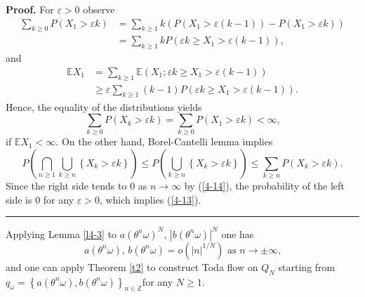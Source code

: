 \documentclass[a4paper]{article}%
\newenvironment{proof}[1][Proof]{\noindent\textbf{#1.} }{\ \rule{0.5em}{0.5em}}
\begin{document}
\begin{proof}
For $\varepsilon>0$ observe%
\begin{align*}
\sum_{k\geq0}P\left(  X_{1}>\varepsilon k\right)   &  =\sum_{k\geq1}k\left(
P\left(  X_{1}>\varepsilon\left(  k-1\right)  \right)  -P\left(
X_{1}>\varepsilon k\right)  \right) \\
&  =\sum_{k\geq1}kP\left(  \varepsilon k\geq X_{1}>\varepsilon\left(
k-1\right)  \right)  \text{,}%
\end{align*}
and%
\begin{align*}
\mathbb{E}X_{1}  &  =\sum_{k\geq1}\mathbb{E}\left(  X_{1};\varepsilon k\geq
X_{1}>\varepsilon\left(  k-1\right)  \right) \\
&  \geq\varepsilon\sum_{k\geq1}\left(  k-1\right)  P\left(  \varepsilon k\geq
X_{1}>\varepsilon\left(  k-1\right)  \right)  \text{.}%
\end{align*}
Hence, the equality of the distributions yields%
\begin{equation}
\sum_{k\geq0}P\left(  X_{k}>\varepsilon k\right)  =\sum_{k\geq0}P\left(
X_{1}>\varepsilon k\right)  <\infty\text{,} \label{4-14}%
\end{equation}
if $\mathbb{E}X_{1}<\infty$. On the other hand, Borel-Cantelli lemma implies
\[
P\left(  \bigcap\limits_{n\geq1}\bigcup\limits_{k\geq n}\left\{
X_{k}>\varepsilon k\right\}  \right)  \leq P\left(  \bigcup\limits_{k\geq
n}\left\{  X_{k}>\varepsilon k\right\}  \right)  \leq\sum\limits_{k\geq
n}P\left(  X_{k}>\varepsilon k\right)  \text{.}%
\]
Since the right side tends to $0$ as $n\rightarrow\infty$ by (\ref{4-14}), the
probability of the left side is $0$ for any $\varepsilon>0$, which implies
(\ref{4-13}).\bigskip
\end{proof}

Applying Lemma \ref{l4-3} to $a\left(  \theta^{n}\omega\right)  ^{N}$,
$\left\vert b\left(  \theta^{n}\omega\right)  \right\vert ^{N}$ one has%
\[
a\left(  \theta^{n}\omega\right)  \text{, \ }b\left(  \theta^{n}\omega\right)
=o\left(  \left\vert n\right\vert ^{1/N}\right)  \text{ \ as \ }%
n\rightarrow\pm\infty\text{,}%
\]
and one can apply Theorem \ref{t2} to construct Toda flow on $Q_{N}$ starting
from $q_{\omega}=\left\{  a\left(  \theta^{n}\omega\right)  ,b\left(
\theta^{n}\omega\right)  \right\}  _{n\in\mathbb{Z}}$for any $N\geq1$.
\end{document}
